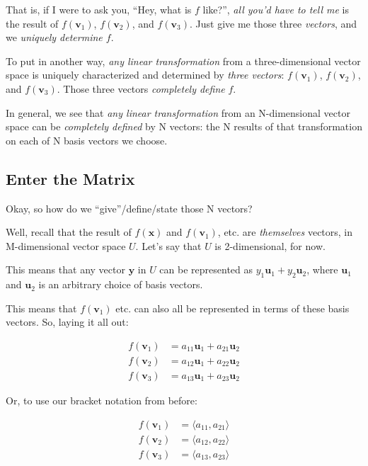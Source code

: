 \documentclass[]{article}
\begin{document}
That is, if I were to ask you, ``Hey, what is \(f\) like?'', \emph{all you'd
have to tell me} is the result of \(f(\mathbf{v}_1)\), \(f(\mathbf{v}_2)\), and
\(f(\mathbf{v}_3)\). Just give me those three \emph{vectors}, and we
\emph{uniquely determine \(f\)}.

To put in another way, \emph{any linear transformation} from a three-dimensional
vector space is uniquely characterized and determined by \emph{three vectors}:
\(f(\mathbf{v}_1)\), \(f(\mathbf{v}_2)\), and \(f(\mathbf{v}_3)\). Those three
vectors \emph{completely define} \(f\).

In general, we see that \emph{any linear transformation} from an N-dimensional
vector space can be \emph{completely defined} by N vectors: the N results of
that transformation on each of N basis vectors we choose.

\subsection{Enter the Matrix}\label{enter-the-matrix}

Okay, so how do we ``give''/define/state those N vectors?

Well, recall that the result of \(f(\mathbf{x})\) and \(f(\mathbf{v}_1)\), etc.
are \emph{themselves} vectors, in M-dimensional vector space \(U\). Let's say
that \(U\) is 2-dimensional, for now.

This means that any vector \(\mathbf{y}\) in \(U\) can be represented as \(y_1
\mathbf{u}_1 + y_2 \mathbf{u}_2\), where \(\mathbf{u}_1\) and \(\mathbf{u}_2\)
is an arbitrary choice of basis vectors.

This means that \(f(\mathbf{v}_1)\) etc. can also all be represented in terms of
these basis vectors. So, laying it all out:

\[
\begin{aligned}
f(\mathbf{v}_1) & = a_{11} \mathbf{u}_1 + a_{21} \mathbf{u}_2 \\
f(\mathbf{v}_2) & = a_{12} \mathbf{u}_1 + a_{22} \mathbf{u}_2 \\
f(\mathbf{v}_3) & = a_{13} \mathbf{u}_1 + a_{23} \mathbf{u}_2
\end{aligned}
\]

Or, to use our bracket notation from before:

\[
\begin{aligned}
f(\mathbf{v}_1) & = \langle a_{11}, a_{21} \rangle \\
f(\mathbf{v}_2) & = \langle a_{12}, a_{22} \rangle \\
f(\mathbf{v}_3) & = \langle a_{13}, a_{23} \rangle
\end{aligned}
\]
\end{document}
